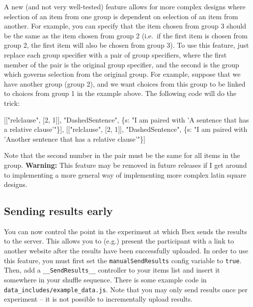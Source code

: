 \documentclass[]{article}
\newenvironment{Shaded}{}{}
\newcommand{\DataTypeTok}[1]{\textcolor[rgb]{0.56,0.13,0.00}{{#1}}}
\newcommand{\DecValTok}[1]{\textcolor[rgb]{0.25,0.63,0.44}{{#1}}}
\newcommand{\StringTok}[1]{\textcolor[rgb]{0.25,0.44,0.63}{{#1}}}
\newcommand{\NormalTok}[1]{{#1}}
\begin{document}
A new (and not very well-tested) feature allows for more complex designs
where selection of an item from one group is dependent on selection of
an item from another. For example, you can specify that the item chosen
from group 3 should be the same as the item chosen from group 2 (i.e.~if
the first item is chosen from group 2, the first item will also be
chosen from group 3). To use this feature, just replace each group
specifier with a pair of group specifiers, where the first member of the
pair is the original group specifier, and the second is the group which
governs selection from the original group. For example, suppose that we
have another group (group 2), and we want choices from this group to be
linked to choices from group 1 in the example above. The following code
will do the trick:

\begin{Shaded}
\begin{Highlighting}[]
    \NormalTok{[[}\StringTok{"relclause"}\NormalTok{, [}\DecValTok{2}\NormalTok{, }\DecValTok{1}\NormalTok{]], }\StringTok{"DashedSentence"}\NormalTok{,}
      \NormalTok{\{}\DataTypeTok{s}\NormalTok{: }\StringTok{"I am paired with 'A sentence that has a relative clause'"}\NormalTok{\}],}
    \NormalTok{[[}\StringTok{"relclause"}\NormalTok{, [}\DecValTok{2}\NormalTok{, }\DecValTok{1}\NormalTok{]], }\StringTok{"DashedSentence"}\NormalTok{,}
      \NormalTok{\{}\DataTypeTok{s}\NormalTok{: }\StringTok{"I am paired with 'Another sentence that has a relative clause'"}\NormalTok{\}]}
\end{Highlighting}
\end{Shaded}

Note that the second number in the pair must be the same for all items
in the group. \textbf{Warning:} This feature may be removed in future
releases if I get around to implementing a more general way of
implementing more complex latin square designs.

\subsection{Sending results early}\label{sending-results-early}

You can now control the point in the experiment at which Ibex sends the
results to the server. This allows you to (e.g.) present the participant
with a link to another website after the results have been successfully
uploaded. In order to use this feature, you must first set the
\texttt{manualSendResults} config variable to \texttt{true}. Then, add a
\texttt{\_\_SendResults\_\_} controller to your items list and insert it
somewhere in your shuffle sequence. There is some example code in
\texttt{data\_includes/example\_data.js}. Note that you may only send
results once per experiment -- it is not possible to incrementally
upload results.
\end{document}
